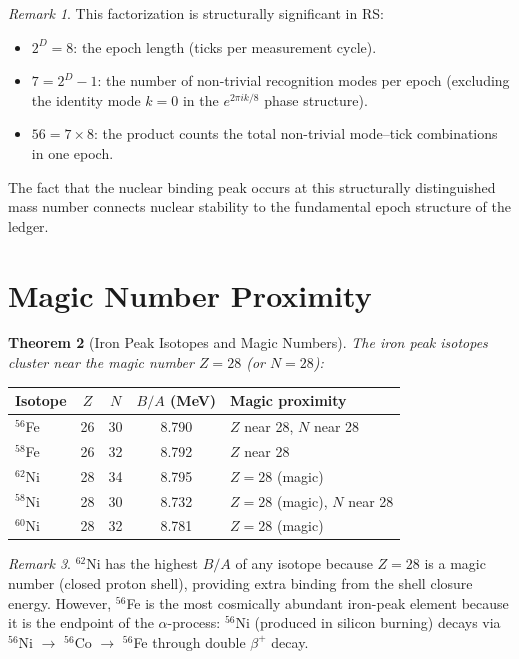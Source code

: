 \documentclass[12pt,a4paper]{article}
\newtheorem{theorem}{Theorem}[section]
\theoremstyle{definition}
\theoremstyle{remark}
\newtheorem{remark}[theorem]{Remark}
\begin{document}
\begin{remark}
This factorization is structurally significant in RS:
\begin{itemize}[nosep]
  \item $2^D = 8$: the epoch length (ticks per measurement cycle).
  \item $7 = 2^D - 1$: the number of non-trivial recognition
  modes per epoch (excluding the identity mode $k = 0$ in the
  $e^{2\pi i k/8}$ phase structure).
  \item $56 = 7 \times 8$: the product counts the total
  non-trivial mode--tick combinations in one epoch.
\end{itemize}
The fact that the nuclear binding peak occurs at this structurally
distinguished mass number connects nuclear stability to the
fundamental epoch structure of the ledger.
\end{remark}

\section{Magic Number Proximity}
\label{sec:magic}

\begin{theorem}[Iron Peak Isotopes and Magic Numbers]
\label{thm:magic}
The iron peak isotopes cluster near the magic number $Z = 28$
(or $N = 28$):
\end{theorem}

\begin{center}
\renewcommand{\arraystretch}{1.3}
\begin{tabular}{lcccl}
\toprule
\textbf{Isotope} & $Z$ & $N$ & $B/A$ (MeV) &
\textbf{Magic proximity} \\
\midrule
$^{56}$Fe & 26 & 30 & 8.790 & $Z$ near 28, $N$ near 28 \\
$^{58}$Fe & 26 & 32 & 8.792 & $Z$ near 28 \\
$^{62}$Ni & 28 & 34 & 8.795 & $Z = 28$ (magic) \\
$^{58}$Ni & 28 & 30 & 8.732 & $Z = 28$ (magic), $N$ near 28 \\
$^{60}$Ni & 28 & 32 & 8.781 & $Z = 28$ (magic) \\
\bottomrule
\end{tabular}
\end{center}

\begin{remark}
$^{62}$Ni has the highest $B/A$ of any isotope because $Z = 28$
is a magic number (closed proton shell), providing extra binding
from the shell closure energy.  However, $^{56}$Fe is the most
cosmically abundant iron-peak element because it is the endpoint
of the $\alpha$-process: $^{56}$Ni (produced in silicon burning)
decays via $^{56}$Ni $\to$ $^{56}$Co $\to$ $^{56}$Fe through
double $\beta^+$ decay.
\end{remark}
\end{document}

